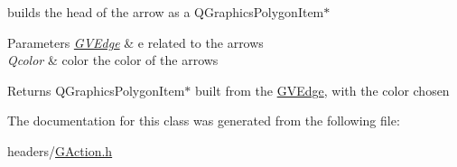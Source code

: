builds the head of the arrow as a \-Q\-Graphics\-Polygon\-Item$\ast$ 


\begin{DoxyParams}{\-Parameters}
{\em \hyperlink{struct_g_v_edge}{\-G\-V\-Edge}} & e related to the arrows \\
\hline
{\em \-Qcolor} & color the color of the arrows\\
\hline
\end{DoxyParams}
\begin{DoxyReturn}{\-Returns}
\-Q\-Graphics\-Polygon\-Item$\ast$ built from the \hyperlink{struct_g_v_edge}{\-G\-V\-Edge}, with the color chosen 
\end{DoxyReturn}


\-The documentation for this class was generated from the following file\-:\begin{DoxyCompactItemize}
\item 
headers/\hyperlink{_g_action_8h}{\-G\-Action.\-h}\end{DoxyCompactItemize}
